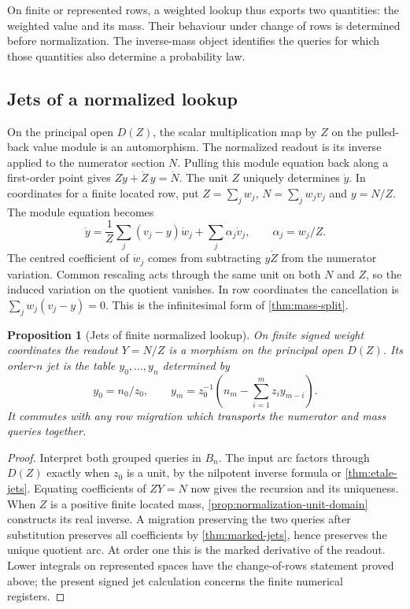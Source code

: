 \documentclass[11pt,a4paper]{article}
\newtheorem{proposition}[proposition]{Proposition}
\theoremstyle{definition}
\theoremstyle{remark}\newaliascnt{remark}{theorem}
\numberwithin{equation}{section}
\begin{document}
On finite or represented rows, a weighted lookup thus exports two quantities: the weighted value and its mass. Their behaviour under change of rows is determined before normalization. The inverse-mass object identifies the queries for which those quantities also determine a probability law.

\subsection{Jets of a normalized lookup}
On the principal open \(D(Z)\), the scalar multiplication map by \(Z\) on the pulled-back value module is an automorphism. The normalized readout is its inverse applied to the numerator section \(N\). Pulling this module equation back along a first-order point gives \(Z\dot y+\dot Z\,y=\dot N\). The unit \(Z\) uniquely determines \(\dot y\). In coordinates for a finite located row, put \(Z=\sum_j w_j\), \(N=\sum_j w_jv_j\) and \(y=N/Z\). The module equation becomes
\begin{equation}\label{eq:unnormdiff}
 \dot y=\frac1Z\sum_j (v_j-y)\dot w_j+\sum_j\alpha_j\dot v_j,\qquad
 \alpha_j=w_j/Z.
\end{equation}
The centred coefficient of \(\dot w_j\) comes from subtracting \(y\dot Z\) from the numerator variation. Common rescaling acts through the same unit on both \(N\) and \(Z\), so the induced variation on the quotient vanishes. In row coordinates the cancellation is \(\sum_j w_j(v_j-y)=0\). This is the infinitesimal form of \cref{thm:mass-split}.

\begin{proposition}[Jets of finite normalized lookup]\label{prop:normalized-jets}
On finite signed weight coordinates the readout $Y=N/Z$ is a morphism on the principal open $D(Z)$. Its order-$n$ jet is the table $y_0,\ldots,y_n$ determined by
\[
 y_0=n_0/z_0,\qquad
 y_m=z_0^{-1}\left(n_m-\sum_{i=1}^m z_i y_{m-i}\right).
\]
It commutes with any row migration which transports the numerator and mass queries together.
\end{proposition}
\begin{proof}
Interpret both grouped queries in $B_n$. The input arc factors through $D(Z)$ exactly when $z_0$ is a unit, by the nilpotent inverse formula or \cref{thm:etale-jets}. Equating coefficients of $ZY=N$ now gives the recursion and its uniqueness. When $Z$ is a positive finite located mass, \cref{prop:normalization-unit-domain} constructs its real inverse. A migration preserving the two queries after substitution preserves all coefficients by \cref{thm:marked-jets}, hence preserves the unique quotient arc. At order one this is the marked derivative of the readout. Lower integrals on represented spaces have the change-of-rows statement proved above; the present signed jet calculation concerns the finite numerical registers.
\end{proof}
\end{document}
